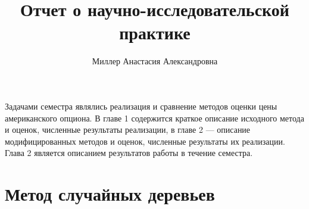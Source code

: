 \documentclass[specialist,
               substylefile = spbu.rtx,
               subf,href,colorlinks=true, 12pt]{disser}
\begin{document}
%
%


\title{Отчет о научно-исследовательской практике}


\author{Миллер Анастасия Александровна}


\date{\number\year}

\maketitle

\tableofcontents

\intro
    \par Задачами семестра являлись реализация и сравнение методов оценки цены американского опциона. В главе 1 содержится краткое описание исходного метода и оценок, численные результаты реализации, в главе 2 --- описание модифицированных методов и оценок, численные результаты их реализации. Глава 2 является описанием результатов работы в течение семестра.
\chapter{Метод случайных деревьев}
\end{document}
